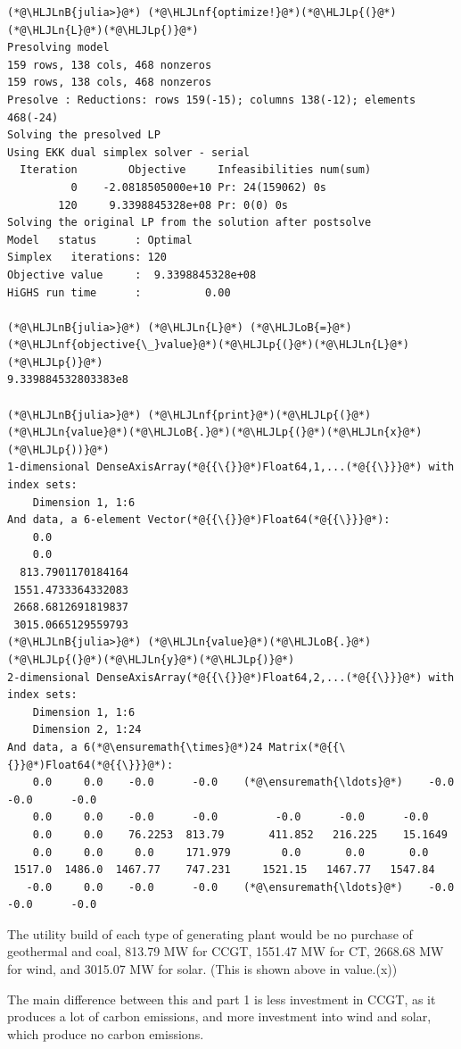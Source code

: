 \documentclass[12pt,a4paper]{article}
\newcommand{\HLJLn}[1]{#1}
\newcommand{\HLJLnf}[1]{\textcolor[RGB]{66,102,213}{#1}}
\newcommand{\HLJLnB}[1]{\textcolor[RGB]{59,151,46}{#1}}
\newcommand{\HLJLoB}[1]{\textcolor[RGB]{102,102,102}{\textbf{#1}}}
\newcommand{\HLJLp}[1]{#1}
\begin{document}
\begin{lstlisting}
(*@\HLJLnB{julia>}@*) (*@\HLJLnf{optimize!}@*)(*@\HLJLp{(}@*)(*@\HLJLn{L}@*)(*@\HLJLp{)}@*)
Presolving model
159 rows, 138 cols, 468 nonzeros
159 rows, 138 cols, 468 nonzeros
Presolve : Reductions: rows 159(-15); columns 138(-12); elements 468(-24)
Solving the presolved LP
Using EKK dual simplex solver - serial
  Iteration        Objective     Infeasibilities num(sum)
          0    -2.0818505000e+10 Pr: 24(159062) 0s
        120     9.3398845328e+08 Pr: 0(0) 0s
Solving the original LP from the solution after postsolve
Model   status      : Optimal
Simplex   iterations: 120
Objective value     :  9.3398845328e+08
HiGHS run time      :          0.00

(*@\HLJLnB{julia>}@*) (*@\HLJLn{L}@*) (*@\HLJLoB{=}@*) (*@\HLJLnf{objective{\_}value}@*)(*@\HLJLp{(}@*)(*@\HLJLn{L}@*)(*@\HLJLp{)}@*)
9.339884532803383e8

(*@\HLJLnB{julia>}@*) (*@\HLJLnf{print}@*)(*@\HLJLp{(}@*)(*@\HLJLn{value}@*)(*@\HLJLoB{.}@*)(*@\HLJLp{(}@*)(*@\HLJLn{x}@*)(*@\HLJLp{))}@*)
1-dimensional DenseAxisArray(*@{{\{}}@*)Float64,1,...(*@{{\}}}@*) with index sets:
    Dimension 1, 1:6
And data, a 6-element Vector(*@{{\{}}@*)Float64(*@{{\}}}@*):
    0.0
    0.0
  813.7901170184164
 1551.4733364332083
 2668.6812691819837
 3015.0665129559793
(*@\HLJLnB{julia>}@*) (*@\HLJLn{value}@*)(*@\HLJLoB{.}@*)(*@\HLJLp{(}@*)(*@\HLJLn{y}@*)(*@\HLJLp{)}@*)
2-dimensional DenseAxisArray(*@{{\{}}@*)Float64,2,...(*@{{\}}}@*) with index sets:
    Dimension 1, 1:6
    Dimension 2, 1:24
And data, a 6(*@\ensuremath{\times}@*)24 Matrix(*@{{\{}}@*)Float64(*@{{\}}}@*):
    0.0     0.0    -0.0      -0.0    (*@\ensuremath{\ldots}@*)    -0.0      -0.0      -0.0
    0.0     0.0    -0.0      -0.0         -0.0      -0.0      -0.0
    0.0     0.0    76.2253  813.79       411.852   216.225    15.1649
    0.0     0.0     0.0     171.979        0.0       0.0       0.0
 1517.0  1486.0  1467.77    747.231     1521.15   1467.77   1547.84
   -0.0     0.0    -0.0      -0.0    (*@\ensuremath{\ldots}@*)    -0.0      -0.0      -0.0
\end{lstlisting}

The utility build of each type of generating plant would be no purchase of geothermal and coal, 813.79 MW for CCGT, 1551.47 MW for CT, 2668.68 MW for wind, and 3015.07 MW for solar. (This is shown above in value.(x))

The main difference between this and part 1 is less investment in CCGT, as it produces a lot of carbon emissions, and more investment into wind and solar, which produce no carbon emissions. 
\end{document}

